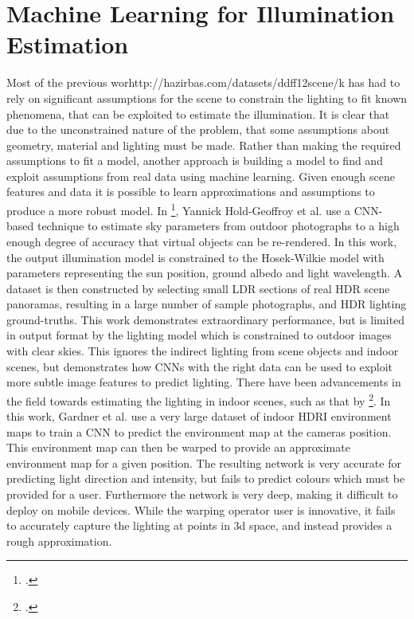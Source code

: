 \documentclass[ %
                    author={Gavin Parker},
                supervisor={Dr. Neill Campbell},
                    degree={MEng},
                     title={Deep Siamese Networks for Illumination Estimation from Stereo Images},
                  subtitle={},
                      type={research},
                      year={2018} ]{dissertation}
\begin{document}
\section{Machine Learning for Illumination Estimation}
Most of the previous worhttp://hazirbas.com/datasets/ddff12scene/k has had to rely on significant assumptions for the scene to constrain the lighting to fit known phenomena, that can be exploited to estimate the illumination. It is clear that due to the unconstrained nature of the problem, that some assumptions about geometry, material and lighting must be made. Rather than making the required assumptions to fit a model, another approach is building a model to find and exploit assumptions from real data using machine learning. Given enough scene features and data it is possible to learn approximations and assumptions to produce a more robust model. In \footcite{https://arxiv.org/pdf/1611.06403.pdf}, Yannick Hold-Geoffroy et al. use a CNN-based technique to estimate sky parameters from outdoor photographs to a high enough degree of accuracy that virtual objects can be re-rendered. In this work, the output illumination model is constrained to the Hosek-Wilkie model with parameters representing the sun position, ground albedo and light wavelength. A dataset is then constructed by selecting small LDR sections of real HDR scene panoramas, resulting in a large number of sample photographs, and HDR lighting ground-truths. This work demonstrates extraordinary performance, but is limited in output format by the lighting model which is constrained to outdoor images with clear skies. This ignores the indirect lighting from scene objects and indoor scenes, but demonstrates how CNNs with the right data can be used to exploit more subtle image features to predict lighting.
\newline
There have been advancements in the field towards estimating the lighting in indoor scenes, such as that by \footcite{https://arxiv.org/pdf/1704.00090.pdf}. In this work, Gardner et al. use a very large dataset of indoor HDRI environment maps to train a CNN to predict the environment map at the cameras position. This environment map can then be warped to provide an approximate environment map for a given position. The resulting network is very accurate for predicting light direction and intensity, but fails to predict colours which must be provided for a user. Furthermore the network is very deep, making it difficult to deploy on mobile devices. While the warping operator user is innovative, it fails to accurately capture the lighting at points in 3d space, and instead provides a rough approximation.
\end{document}
